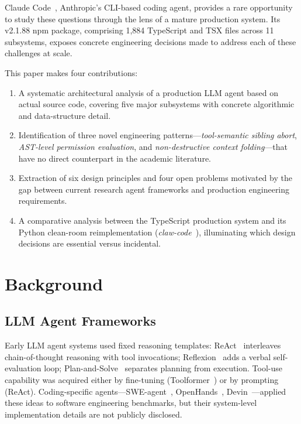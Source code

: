 \documentclass{article}
\begin{document}
Claude Code~\cite{anthropic2024claudecode}, Anthropic's CLI-based coding agent, provides a rare opportunity to study these questions through the lens of a mature production system. Its v2.1.88 npm package, comprising 1,884 TypeScript and TSX files across 11 subsystems, exposes concrete engineering decisions made to address each of these challenges at scale.

This paper makes four contributions:
\begin{enumerate}
  \item A systematic architectural analysis of a production LLM agent based on actual source code, covering five major subsystems with concrete algorithmic and data-structure detail.
  \item Identification of three novel engineering patterns---\emph{tool-semantic sibling abort}, \emph{AST-level permission evaluation}, and \emph{non-destructive context folding}---that have no direct counterpart in the academic literature.
  \item Extraction of six design principles and four open problems motivated by the gap between current research agent frameworks and production engineering requirements.
  \item A comparative analysis between the TypeScript production system and its Python clean-room reimplementation (\emph{claw-code}~\cite{clawcode2026}), illuminating which design decisions are essential versus incidental.
\end{enumerate}

\section{Background}

\subsection{LLM Agent Frameworks}

Early LLM agent systems used fixed reasoning templates: ReAct~\cite{yao2022react} interleaves chain-of-thought reasoning with tool invocations; Reflexion~\cite{shinn2023reflexion} adds a verbal self-evaluation loop; Plan-and-Solve~\cite{wang2023plan} separates planning from execution. Tool-use capability was acquired either by fine-tuning (Toolformer~\cite{schick2023toolformer}) or by prompting (ReAct). Coding-specific agents---SWE-agent~\cite{yang2024sweagent}, OpenHands~\cite{wang2024openhands}, Devin~\cite{cognition2024devin}---applied these ideas to software engineering benchmarks, but their system-level implementation details are not publicly disclosed.
\end{document}

